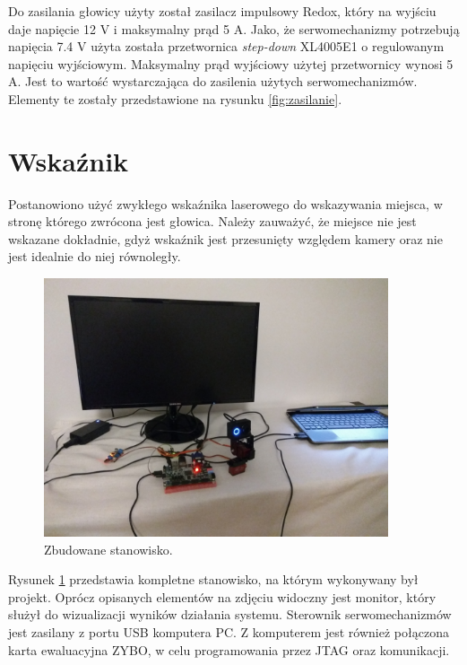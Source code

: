 Do zasilania głowicy użyty został zasilacz impulsowy Redox, który na wyjściu daje napięcie 12 V i maksymalny prąd 5 A. Jako, że serwomechanizmy potrzebują napięcia 7.4 V użyta została przetwornica \textit{step-down} XL4005E1 o regulowanym napięciu wyjściowym. Maksymalny prąd wyjściowy użytej przetwornicy wynosi 5 A.
Jest to wartość wystarczająca do zasilenia użytych serwomechanizmów.
Elementy te zostały przedstawione na rysunku \ref{fig:zasilanie}.

\section{Wskaźnik}
\label{sec:wskaznik}

Postanowiono użyć zwykłego wskaźnika laserowego do wskazywania miejsca, w stronę którego zwrócona jest głowica. Należy zauważyć, że miejsce nie jest wskazane dokładnie, gdyż wskaźnik jest przesunięty względem kamery oraz nie jest idealnie do niej równoległy.

\begin{figure}[h]
	\centering
	\includegraphics[width=4in]{kompletne_stanowisko.jpg}
	\caption{Zbudowane stanowisko.}
	\label{fig:kompletne_stanowisko}
\end{figure}

Rysunek \ref{fig:kompletne_stanowisko} przedstawia kompletne stanowisko, na którym wykonywany był projekt. Oprócz opisanych elementów na zdjęciu widoczny jest monitor, który służył do wizualizacji wyników działania systemu. Sterownik serwomechanizmów jest zasilany z portu USB komputera PC. Z komputerem jest również połączona karta ewaluacyjna ZYBO, w celu programowania przez JTAG oraz komunikacji.
